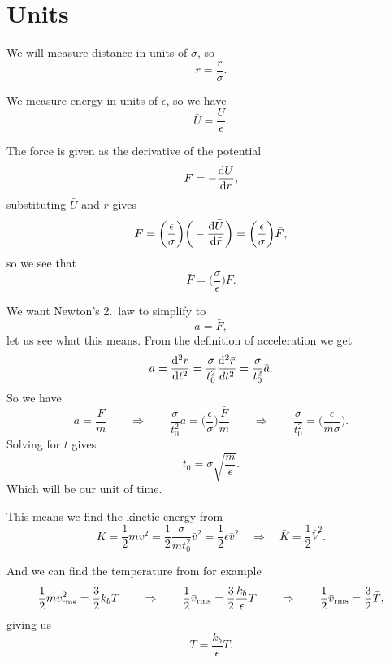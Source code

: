 \documentclass[a4paper, 11pt, notitlepage, english]{article}
\renewcommand{\d}{{\rm d}}
\newcommand{\To}{\quad\Rightarrow\quad}
\newcommand{\eps}{\epsilon}
\begin{document}
\section*{Units}

We will measure distance in units of $\sigma$, so
$$\bar{r} = \frac{r}{\sigma}.$$

We measure energy in units of $\eps$, so we have
$$\bar{U} = \frac{U}{\eps}.$$

The force is given as the derivative of the potential
$$F = -\frac{\d U}{\d r},$$
substituting $\bar U$ and $\bar r$ gives
$$F = \bigg(\frac{\eps}{\sigma}\bigg)\bigg(-\frac{\d \bar{U}}{\d \bar{r}}\bigg) = \bigg(\frac{\eps}{\sigma}\bigg)\bar{F},$$
so we see that
$$\bar{F} = \bigg(\frac{\sigma}{\eps}\bigg)F.$$

We want Newton's 2.\ law to simplify to
$$\bar{a} = \bar{F},$$
let us see what this means. From the definition of acceleration we get
$$a = \frac{\d^2 r}{\d t^2} = \frac{\sigma}{t_0^2} \frac{\d^2 \bar{r}}{d\bar{t}^2} = \frac{\sigma}{t_0^2}\bar{a}.$$ 
So we have
$$a = \frac{F}{m} \qquad \Rightarrow \qquad  \frac{\sigma}{t_0^2}\bar{a} = \bigg(\frac{\eps}{\sigma}\bigg)\frac{\bar{F}}{m} \qquad \Rightarrow \qquad \frac{\sigma}{t_0^2} = \bigg(\frac{\eps}{m\sigma}\bigg).$$
Solving for $t$ gives
$$t_0 = \sigma\sqrt{\frac{m}{\eps}}.$$
Which will be our unit of time.

This means we find the kinetic energy from
$$K = \frac{1}{2}mv^2 = \frac{1}{2}\frac{\sigma}{mt_0^2}\bar{v}^2 = \frac{1}{2}\eps \bar{v}^2 \quad \Rightarrow \quad \bar{K} = \frac{1}{2}\bar{V}^2.$$

And we can find the temperature from for example
$$\frac{1}{2}mv_{\rm rms}^2 = \frac{3}{2}k_b T \quad \To \quad \frac{1}{2}\bar{v}_{\rm rms} = \frac{3}{2}\frac{k_b}{\eps} T \quad \To \quad \frac{1}{2}\bar{v}_{\rm rms} = \frac{3}{2}\bar {T},$$
giving us
$$\bar{T} = \frac{k_b}{\eps}T.$$
\end{document}
